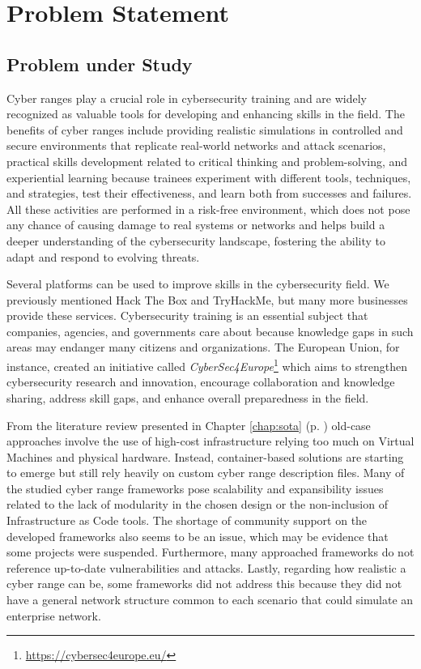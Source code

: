 \chapter{Problem Statement}\label{chap:problem_statement}

\minitoc

\section{Problem under Study} \label{sec:research_problem}

Cyber ranges play a crucial role in cybersecurity training and are widely recognized as valuable tools for developing and enhancing skills in the field. The benefits of cyber ranges include providing realistic simulations in controlled and secure environments that replicate real-world networks and attack scenarios, practical skills development related to critical thinking and problem-solving, and experiential learning because trainees experiment with different tools, techniques, and strategies, test their effectiveness, and learn both from successes and failures. All these activities are performed in a risk-free environment, which does not pose any chance of causing damage to real systems or networks and helps build a deeper understanding of the cybersecurity landscape, fostering the ability to adapt and respond to evolving threats. 

Several platforms can be used to improve skills in the cybersecurity field. We previously mentioned Hack The Box and TryHackMe, but many more businesses provide these services. Cybersecurity training is an essential subject that companies, agencies, and governments care about because knowledge gaps in such areas may endanger many citizens and organizations. The European Union, for instance, created an initiative called \textit{CyberSec4Europe}\footnote{\url{https://cybersec4europe.eu/}} which aims to strengthen cybersecurity research and innovation, encourage collaboration and knowledge sharing, address skill gaps, and enhance overall preparedness in the field. 

From the literature review presented in Chapter \ref{chap:sota} (p. \pageref{chap:sota}) old-case approaches involve the use of high-cost infrastructure relying too much on Virtual Machines and physical hardware. Instead, container-based solutions are starting to emerge but still rely heavily on custom cyber range description files. Many of the studied cyber range frameworks pose scalability and expansibility issues related to the lack of modularity in the chosen design or the non-inclusion of Infrastructure as Code tools. The shortage of community support on the developed frameworks also seems to be an issue, which may be evidence that some projects were suspended. Furthermore, many approached frameworks do not reference up-to-date vulnerabilities and attacks. Lastly, regarding how realistic a cyber range can be, some frameworks did not address this because they did not have a general network structure common to each scenario that could simulate an enterprise network. 

